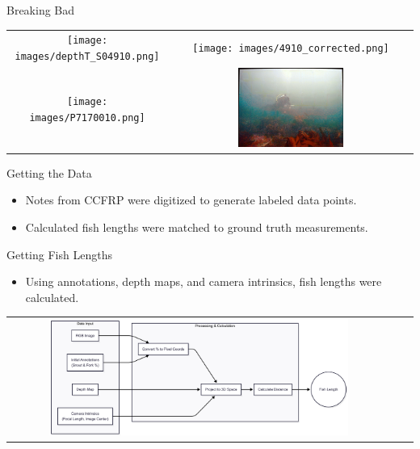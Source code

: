 \begin{frame}{Breaking Bad}
    \centering
    \begin{tabular}{cc}
        \texttt{[image: images/depthT\_S04910.png]} &
        \texttt{[image: images/4910\_corrected.png]} \\
        \texttt{[image: images/P7170010.png]} &
        \includegraphics[width=0.45\textwidth]{images/P7170010_corrected.JPG} \\
    \end{tabular}
\end{frame}

\begin{frame}{Getting the Data}
    \begin{itemize}
        \item Notes from CCFRP were digitized to generate labeled data points.
        \item Calculated fish lengths were matched to ground truth measurements.
    \end{itemize}
\end{frame}

\begin{frame}{Getting Fish Lengths}
    \begin{itemize}
        \item Using annotations, depth maps, and camera intrinsics, fish lengths were calculated.
    \end{itemize}
    \vspace{1em}
    \centering
    \begin{tabular}{ccc}
        \includegraphics[width=0.8\textwidth]{images/length_measurement_pipeline.png} &
    \end{tabular}
\end{frame}

